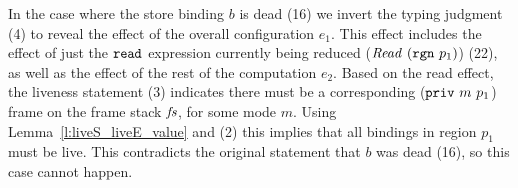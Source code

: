 In the case where the store binding $b$ is dead (16) we invert the typing judgment (4) to reveal the effect of the overall configuration $e_1$. This effect includes the effect of just the $\texttt{read}$ expression currently being reduced ($\mathit{Read}~ (\texttt{rgn}~ p_1)$) (22), as well as the effect of the rest of the computation $e_2$. Based on the read effect, the liveness statement (3) indicates there must be a corresponding ($\texttt{priv}~ m~ p_1$) frame on the frame stack $\mathit{fs}$, for some mode $m$. Using Lemma~\ref{l:liveS_liveE_value} and (2) this implies that all bindings in region $p_1$ must be live. This contradicts the original statement that $b$ was dead (16), so this case cannot happen.
\qqed

